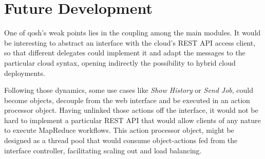 \section*{Future Development}\label{sec:directricesfuturo}
\noindent One of qosh's weak points lies in the coupling among the main modules. It would be interesting to abstract an interface with the cloud's REST API access client, so that different delegates could implement it and adapt the messages to the particular cloud syntax, opening indirectly the possibility to hybrid cloud deployments.

Following those dynamics, some use cases like \emph{Show History} or \emph{Send Job}, could become objects, decouple from the web interface and be executed in an action processor object. Having unlinked those actions off the interface, it would not be hard to implement a particular REST API that would allow clients of any nature to execute MapReduce workflows. This action processor object, might be designed as a thread pool that would consume object-actions fed from the interface controller, facilitating scaling out and load balancing.
